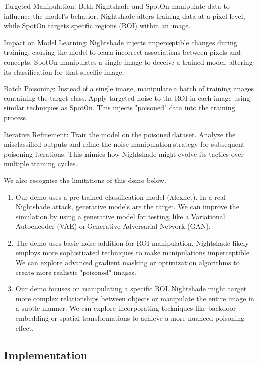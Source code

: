 \documentclass{article}
\begin{document}
Targeted Manipulation: Both Nightshade and SpotOn manipulate data to influence the model's behavior. Nightshade alters training data at a pixel level, while SpotOn targets specific regions (ROI) within an image.

Impact on Model Learning: Nightshade injects imperceptible changes during training, causing the model to learn incorrect associations between pixels and concepts. SpotOn manipulates a single image to deceive a trained model, altering its classification for that specific image.

Batch Poisoning: Instead of a single image, manipulate a batch of training images containing the target class. Apply targeted noise to the ROI in each image using similar techniques as SpotOn. This injects "poisoned" data into the training process.

Iterative Refinement: Train the model on the poisoned dataset. Analyze the misclassified outputs and refine the noise manipulation strategy for subsequent poisoning iterations. This mimics how Nightshade might evolve its tactics over multiple training cycles.

We also recognise the limitations of this demo below.
\begin{enumerate}
      \item Our demo uses a pre-trained classification model (Alexnet). In a real Nightshade attack, generative models are the target. We can improve the simulation by using a generative model for testing, like a Variational Autoencoder (VAE) or Generative Adversarial Network (GAN).
      
      \item The demo uses basic noise addition for ROI manipulation. Nightshade likely employs more sophisticated techniques to make manipulations imperceptible. We can explore advanced gradient masking or optimization algorithms to create more realistic "poisoned" images.
      
      \item Our demo focuses on manipulating a specific ROI. Nightshade might target more complex relationships between objects or manipulate the entire image in a subtle manner. We can explore incorporating techniques like backdoor embedding or spatial transformations to achieve a more nuanced poisoning effect.
\end{enumerate}

\subsection{Implementation}
\end{document}
